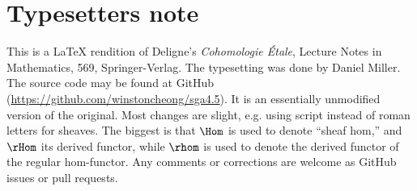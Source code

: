 
\section*{Typesetters note}

This is a \LaTeX{} rendition of Deligne's \emph{Cohomologie \'Etale}, Lecture 
Notes in Mathematics, 569, Springer-Verlag. The 
typesetting was done by Daniel Miller. The source code may be found at
GitHub (\url{https://github.com/winstoncheong/sga4.5}). It is an essentially
unmodified version of the original. Most changes are slight, e.g. using
script instead of roman letters for sheaves. The biggest is that
$\Hom$ is used to denote ``sheaf hom,'' and $\rHom$ its derived functor, while
$\rhom$ is used to denote the derived functor of the regular hom-functor. Any
comments or corrections are welcome as GitHub issues or pull requests.